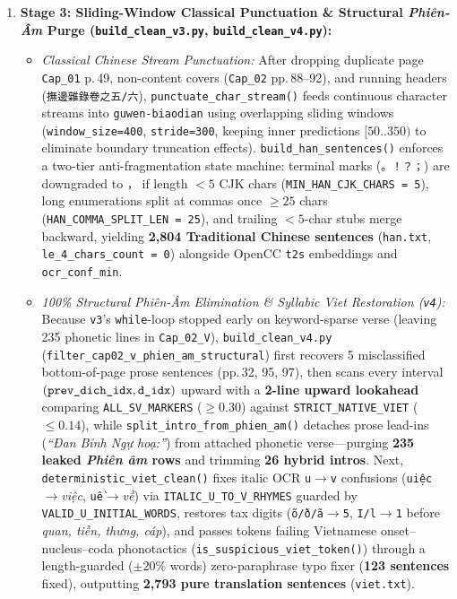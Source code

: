 \documentclass[a4paper]{article}
\begin{document}
\begin{enumerate}
  \item \textbf{Stage 3: Sliding-Window Classical Punctuation \& Structural \textit{Phiên-Âm} Purge (\texttt{build\_clean\_v3.py}, \texttt{build\_clean\_v4.py}):}
  \begin{itemize}
    \item \textit{Classical Chinese Stream Punctuation:} After dropping duplicate page \texttt{Cap\_01} p.\,49, non-content covers (\texttt{Cap\_02} pp.\,88--92), and running headers (\texttt{撫邊雜錄卷之五/六}), \texttt{punctuate\_char\_stream()} feeds continuous character streams into \texttt{guwen-biaodian} using overlapping sliding windows (\texttt{window\_size=400}, \texttt{stride=300}, keeping inner predictions $[50..350)$ to eliminate boundary truncation effects). \texttt{build\_han\_sentences()} enforces a two-tier anti-fragmentation state machine: terminal marks (\texttt{。！？；}) are downgraded to \texttt{，} if length $<5$ CJK chars (\texttt{MIN\_HAN\_CJK\_CHARS = 5}), long enumerations split at commas once $\ge 25$ chars (\texttt{HAN\_COMMA\_SPLIT\_LEN = 25}), and trailing $<5$-char stubs merge backward, yielding \textbf{2,804 Traditional Chinese sentences} (\texttt{han.txt}, \texttt{le\_4\_chars\_count = 0}) alongside OpenCC \texttt{t2s} embeddings and \texttt{ocr\_conf\_min}.
    \item \textit{100\% Structural \textit{Phiên-Âm} Elimination \& Syllabic Viet Restoration (\texttt{v4}):} Because \texttt{v3}'s \texttt{while}-loop stopped early on keyword-sparse verse (leaving 235 phonetic lines in \texttt{Cap\_02\_V}), \texttt{build\_clean\_v4.py} (\texttt{filter\_cap02\_v\_phien\_am\_structural}) first recovers 5 misclassified bottom-of-page prose sentences (pp.\,32, 95, 97), then scans every interval $(\text{\texttt{prev\_dich\_idx}}, \text{\texttt{d\_idx}})$ upward with a \textbf{2-line upward lookahead} comparing \texttt{ALL\_SV\_MARKERS} ($\ge 0.30$) against \texttt{STRICT\_NATIVE\_VIET} ($\le 0.14$), while \texttt{split\_intro\_from\_phien\_am()} detaches prose lead-ins (\textit{``Đan Bỉnh Ngự hoạ:''}) from attached phonetic verse---purging \textbf{235 leaked \textit{Phiên âm} rows} and trimming \textbf{26 hybrid intros}. Next, \texttt{deterministic\_viet\_clean()} fixes italic OCR \texttt{u}$\to$\texttt{v} confusions (\texttt{uiệc}$\to$\textit{việc}, \texttt{uề}$\to$\textit{về}) via \texttt{ITALIC\_U\_TO\_V\_RHYMES} guarded by \texttt{VALID\_U\_INITIAL\_WORDS}, restores tax digits (\texttt{õ/ð/ã}$\to$\texttt{5}, \texttt{I/l}$\to$\texttt{1} before \textit{quan, tiền, thưng, cáp}), and passes tokens failing Vietnamese onset--nucleus--coda phonotactics (\texttt{is\_suspicious\_viet\_token()}) through a length-guarded ($\pm 20\%$ words) zero-paraphrase typo fixer (\textbf{123 sentences} fixed), outputting \textbf{2,793 pure translation sentences} (\texttt{viet.txt}).
  \end{itemize}


\end{enumerate}
\end{document}
